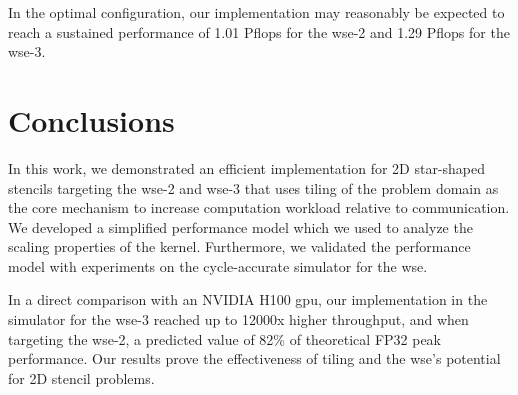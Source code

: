 In the optimal configuration, our implementation may reasonably be expected to reach a sustained performance of 1.01 P\acp{flop} for the \ac{wse}-2 and 1.29 P\acp{flop} for the \ac{wse}-3.

\section{Conclusions}
In this work, we demonstrated an efficient implementation for 2D star-shaped stencils targeting the \ac{wse}-2 and \ac{wse}-3 that uses tiling of the problem domain as the core mechanism to increase computation workload relative to communication. We developed a simplified performance model which we used to analyze the scaling properties of the kernel. Furthermore, we validated the performance model with experiments on the cycle-accurate simulator for the \ac{wse}.

In a direct comparison with an NVIDIA H100 \ac{gpu}, our implementation in the simulator for the \ac{wse}-3 reached up to 12000x higher throughput, and when targeting the \ac{wse}-2, a predicted value of 82\% of theoretical FP32 peak performance. Our results prove the effectiveness of tiling and the \ac{wse}'s potential for 2D stencil problems.